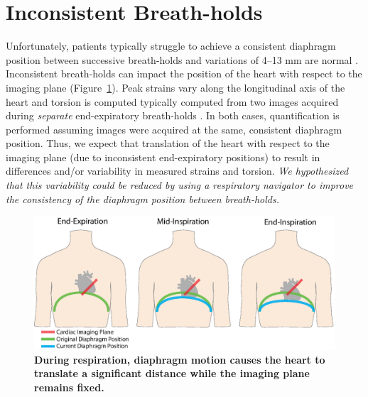 \section{Inconsistent Breath-holds}
	Unfortunately, patients typically struggle to achieve a consistent diaphragm position between successive breath-holds and variations of 4--13 mm are normal \cite{Liu1993,Wang1995a,Taylor1997a,Holland1998c,Fischer2006a}. Inconsistent breath-holds can impact the position of the heart with respect to the imaging plane (Figure~\ref{fig:range_of_diaphragm_position_breathing}). Peak strains vary along the longitudinal axis of the heart \cite{Kuijer2002,Moore2000,Young1994a,Feng2009,NasiraeiMoghaddam2010,Donekal2013a,Suever2017} and torsion is computed typically computed from two images acquired during \textit{separate} end-expiratory breath-holds \cite{Donekal2013a}. In both cases, quantification is performed assuming images were acquired at the same, consistent diaphragm position. Thus, we expect that translation of the heart with respect to the imaging plane (due to inconsistent end-expiratory positions) to result in differences and/or variability in measured strains and torsion. \textit{We hypothesized that this variability could be reduced by using a respiratory navigator to improve the consistency of the diaphragm position between breath-holds.}
	
	\begin{figure}
		\centering
		\includegraphics{figures/intro/range_of_diaphragm_position_breathing}
		\caption[During respiration, diaphragm motion causes the heart to translate a significant distance while the imaging plane remains fixed]{\textbf{During respiration, diaphragm motion causes the heart to translate a significant distance while the imaging plane remains fixed.}}
		\label{fig:range_of_diaphragm_position_breathing}
	\end{figure}
	
